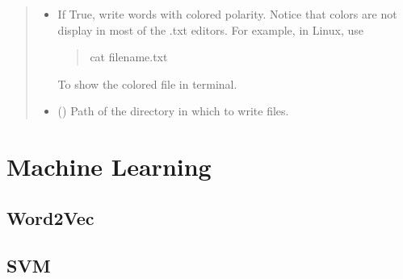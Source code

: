 \documentclass[letterpaper,10pt,english]{sphinxmanual}
\begin{document}
\begin{fulllineitems}
\begin{quote}
\begin{description}
\begin{itemize}
\item {} 
 \textendash{} 
If True, write words with colored polarity. Notice that colors are not display in most of the .txt editors.
For example, in Linux, use
\begin{quote}

%
\begin{sphinxVerbatim}[commandchars=\\\{\}]
cat file\PYGZus{}name.txt
\end{sphinxVerbatim}
\end{quote}

To show the colored file in terminal.


\item {} 
 () \textendash{} Path of the directory in which to write files.

\end{itemize}

\end{description}\end{quote}

\end{fulllineitems}



\chapter{Machine Learning}
\label{\detokenize{learning:machine-learning}}\label{\detokenize{learning::doc}}

\section{Word2Vec}
\label{\detokenize{learning:word2vec}}

\section{SVM}
\label{\detokenize{learning:module-loacore.learning.svm}}\label{\detokenize{learning:svm}}
\end{document}
